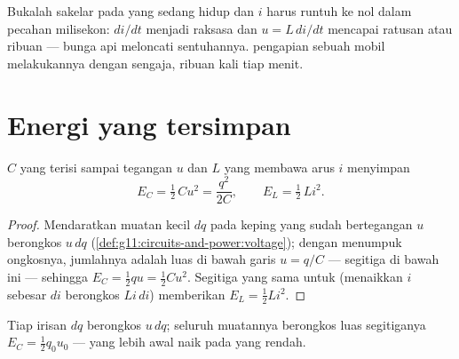 \begin{remark}\label{rem:g12:rc-rl-circuits:spark}
Bukalah sakelar pada  yang sedang hidup dan $i$ harus runtuh ke nol dalam pecahan
milisekon: $di/dt$ menjadi raksasa dan $u = L\,di/dt$ mencapai ratusan
atau ribuan  --- bunga api meloncati sentuhannya.  pengapian sebuah mobil
melakukannya dengan sengaja, ribuan kali tiap menit.
\end{remark}

\section{Energi yang tersimpan}

\begin{proposition}\label{prop:g12:rc-rl-circuits:energy}
 $C$ yang terisi sampai tegangan $u$ dan  $L$ yang membawa arus
$i$ menyimpan
\[
E_C = \tfrac12\,C u^2 = \frac{q^2}{2C},
\qquad
E_L = \tfrac12\,L i^2 .
\]
\end{proposition}

\begin{proof}
Mendaratkan muatan kecil $dq$ pada keping yang sudah bertegangan $u$ berongkos
$u\,dq$ (\cref{def:g11:circuits-and-power:voltage}); dengan menumpuk
ongkosnya, jumlahnya adalah luas di bawah garis $u = q/C$ --- segitiga
di bawah ini --- sehingga $E_C = \tfrac12 qu = \tfrac12 Cu^2$. Segitiga yang sama untuk
 (menaikkan $i$ sebesar $di$ berongkos $Li\,di$) memberikan
$E_L = \tfrac12 Li^2$.
\end{proof}

\begin{omfigure}

{\small Tiap irisan $dq$ berongkos $u\,dq$; seluruh muatannya berongkos
luas segitiganya $E_C = \tfrac12 q_0 u_0$ ---  yang lebih awal naik
pada  yang rendah.}
\end{omfigure}

